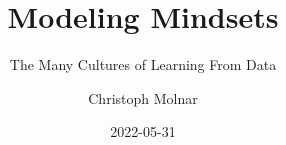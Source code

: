 \documentclass[
  10pt,
]{scrbook}
\title{Modeling Mindsets}
\subtitle{The Many Cultures of Learning From Data}
\author{Christoph Molnar}
\date{2022-05-31}
\begin{document}
\maketitle

\thispagestyle{empty}

\end{document}
